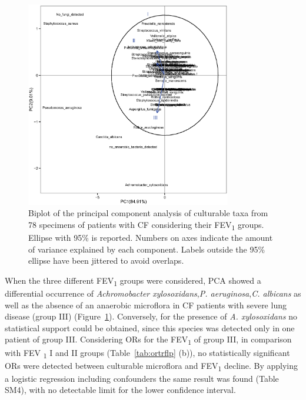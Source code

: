 \begin{figure}[!tb]
	\centering
	\includegraphics[width=0.8\textwidth]{./figures/Chapter_7/Figure_2_fev1_taxa}
  	\caption{\label{fig:fig2fev1taxa}Biplot of the principal component analysis of culturable taxa from 78 specimens of patients with CF considering their FEV\textsubscript{1} groups. Ellipse with 95\% is reported. Numbers on axes indicate the amount of variance explained by each component. Labels outside the 95\% ellipse have been jittered to avoid overlaps.}
\end{figure}%
When the three different FEV{\textsubscript{1}} groups were considered, PCA showed a differential occurrence of \textit{Achromobacter xylosoxidans},\textit{P. aeruginosa},\textit{C. albicans} as well as the absence of an anaerobic microflora in CF patients with severe lung disease (group III) (Figure~\ref{fig:fig2fev1taxa}). Conversely, for the presence of \textit{A. xylosoxidans} no statistical support could be obtained, since this species was detected only in one patient of group III. Considering ORs for the FEV\textsubscript{1} of group III, in comparison with FEV \textsubscript{1} I and II groups (Table~\ref{tab:ortrflp} (b)), no statistically significant ORs were detected between culturable microflora and FEV\textsubscript{1} decline. By applying a logistic regression including confounders the same result was found (Table SM4), with no detectable limit for the lower confidence interval.\\
